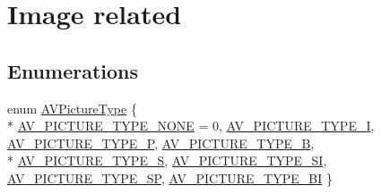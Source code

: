 \hypertarget{group__lavu__picture}{}\section{Image related}
\label{group__lavu__picture}
\subsection*{Enumerations}
\begin{DoxyCompactItemize}
\item 
enum \hyperlink{group__lavu__picture_gae6cbcab1f70d8e476757f1c1f5a0a78e}{A\+V\+Picture\+Type} \{ \\*
\hyperlink{group__lavu__picture_ggae6cbcab1f70d8e476757f1c1f5a0a78ea33183189d771e3325ccdd36fa980b6f6}{A\+V\+\_\+\+P\+I\+C\+T\+U\+R\+E\+\_\+\+T\+Y\+P\+E\+\_\+\+N\+O\+NE} = 0, 
\hyperlink{group__lavu__picture_ggae6cbcab1f70d8e476757f1c1f5a0a78ea02be39f151a8ace7a65c86e13053e817}{A\+V\+\_\+\+P\+I\+C\+T\+U\+R\+E\+\_\+\+T\+Y\+P\+E\+\_\+I}, 
\hyperlink{group__lavu__picture_ggae6cbcab1f70d8e476757f1c1f5a0a78eaa6fc0479507a03f173f07fc75dab2193}{A\+V\+\_\+\+P\+I\+C\+T\+U\+R\+E\+\_\+\+T\+Y\+P\+E\+\_\+P}, 
\hyperlink{group__lavu__picture_ggae6cbcab1f70d8e476757f1c1f5a0a78ead22f8968e99bc48897c3f4ac29e82dae}{A\+V\+\_\+\+P\+I\+C\+T\+U\+R\+E\+\_\+\+T\+Y\+P\+E\+\_\+B}, 
\\*
\hyperlink{group__lavu__picture_ggae6cbcab1f70d8e476757f1c1f5a0a78eac279237c3b09bb9f7ece0675658e65ad}{A\+V\+\_\+\+P\+I\+C\+T\+U\+R\+E\+\_\+\+T\+Y\+P\+E\+\_\+S}, 
\hyperlink{group__lavu__picture_ggae6cbcab1f70d8e476757f1c1f5a0a78eaa7199b8035cf5a076a05a7fcf6dfc7fe}{A\+V\+\_\+\+P\+I\+C\+T\+U\+R\+E\+\_\+\+T\+Y\+P\+E\+\_\+\+SI}, 
\hyperlink{group__lavu__picture_ggae6cbcab1f70d8e476757f1c1f5a0a78ea83789bae2515a1ce384a88f074244e4e}{A\+V\+\_\+\+P\+I\+C\+T\+U\+R\+E\+\_\+\+T\+Y\+P\+E\+\_\+\+SP}, 
\hyperlink{group__lavu__picture_ggae6cbcab1f70d8e476757f1c1f5a0a78ea71f9f194b0cbe86778cb6df41b867cf3}{A\+V\+\_\+\+P\+I\+C\+T\+U\+R\+E\+\_\+\+T\+Y\+P\+E\+\_\+\+BI}
 \}
\end{DoxyCompactItemize}
